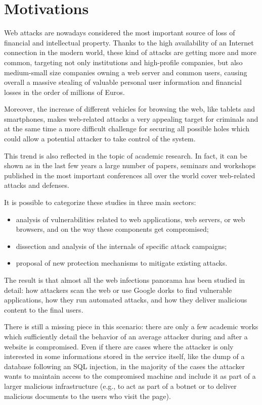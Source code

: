 \section{Motivations}

Web attacks are nowadays considered the most important source of loss of financial and intellectual property.
Thanks to the high availability of an Internet connection in the modern world, these kind of attacks are getting more and more common, targeting not only institutions and high-profile companies, but also medium-small size companies owning a web server and common users, causing overall a massive stealing of valuable personal user information and financial losses in the order of millions of Euros.

Moreover, the increase of different vehicles for browsing the web, like tablets and smartphones, makes web-related attacks a very appealing target for criminals and at the same time a more difficult challenge for securing all possible holes which could allow a potential attacker to take control of the system.

This trend is also reflected in the topic of academic research. In fact, it can be shown as in the last few years a large number of papers, seminars and workshops published in the most important conferences all over the world cover web-related attacks and defenses.

It is possible to categorize these studies in three main sectors:
\begin{itemize}
\item analysis of vulnerabilities related to web applications, web servers, or web browsers, and on the way these components get compromised;
\item dissection and analysis of the internals of specific attack campaigns;
\item proposal of new protection mechanisms to mitigate existing attacks.
\end{itemize}
The result is that almost all the web infections panorama has been studied in detail: how attackers scan the web or use Google dorks to find vulnerable applications, how they run automated attacks, and how they deliver malicious content to the final users.

There is still a missing piece in this scenario: there are only a few academic works which sufficiently detail the behavior of an average attacker during and after a website is compromised.
Even if there are cases where the attacker is only interested in some informations stored in the service itself, like the dump of a database following an SQL injection, in the majority of the cases the attacker wants to maintain access to the compromised machine and include it as part of a larger malicious infrastructure (e.g., to act as part of a botnet or to deliver malicious documents to the users who visit the page).

